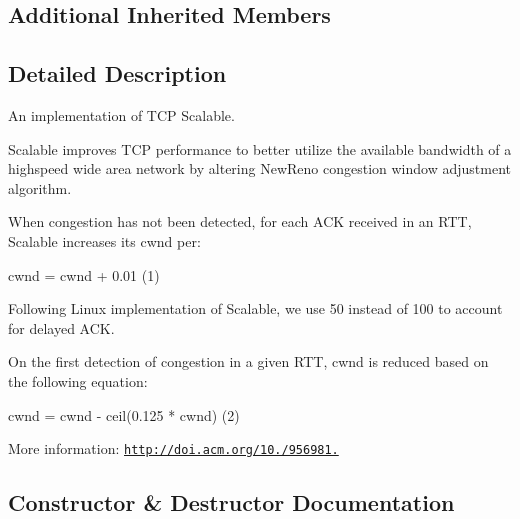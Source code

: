 \subsection*{Additional Inherited Members}


\subsection{Detailed Description}
An implementation of T\+CP Scalable. 

Scalable improves T\+CP performance to better utilize the available bandwidth of a highspeed wide area network by altering New\+Reno congestion window adjustment algorithm.

When congestion has not been detected, for each A\+CK received in an R\+TT, Scalable increases its cwnd per\+: \begin{DoxyVerb}    cwnd = cwnd + 0.01                  (1)
\end{DoxyVerb}


Following Linux implementation of Scalable, we use 50 instead of 100 to account for delayed A\+CK.

On the first detection of congestion in a given R\+TT, cwnd is reduced based on the following equation\+: \begin{DoxyVerb}    cwnd = cwnd - ceil(0.125 * cwnd)       (2)
\end{DoxyVerb}


More information\+: \href{http://doi.acm.org/10.1145/956981.956989}{\tt http\+://doi.\+acm.\+org/10./956981.} 

\subsection{Constructor \& Destructor Documentation}
